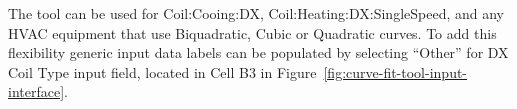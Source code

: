 The tool can be used for Coil:Cooing:DX, Coil:Heating:DX:SingleSpeed,  and any HVAC equipment that use Biquadratic, Cubic or Quadratic curves. To add this flexibility generic input data labels can be populated by selecting ``Other'' for DX Coil Type input field, located in Cell B3 in Figure~\ref{fig:curve-fit-tool-input-interface}.
